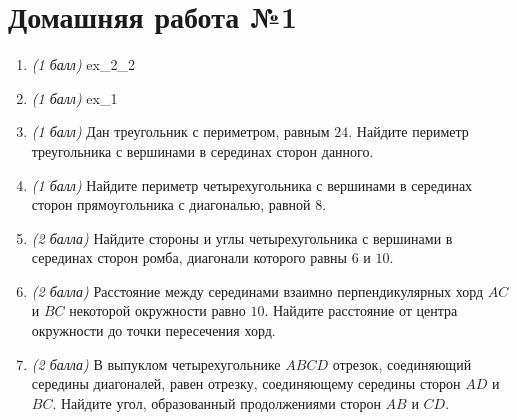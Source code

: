 \documentclass[12pt, a4paper]{article}
\begin{document}
	
	   \cfoot{}
	\section*{Домашняя работа №1}
	\begin{enumerate}
		\item \textit{(1 балл)} {ex_2_2}
		\item \textit{(1 балл)} {ex_1}
		\item \textit{(1 балл)} Дан треугольник с периметром, равным $24$. Найдите периметр треугольника с вершинами в серединах сторон данного.
		\item \textit{(1 балл)} Найдите периметр четырехугольника с вершинами в серединах сторон прямоугольника с диагональю, равной $8$.
		\item \textit{(2 балла)} Найдите стороны и углы четырехугольника с вершинами в серединах сторон ромба, диагонали которого равны $6$ и $10$.
		\item \textit{(2 балла)} Расстояние между серединами взаимно перпендикулярных хорд $AC$ и $BC$ некоторой окружности равно $10$. Найдите расстояние от центра окружности до точки пересечения хорд.
		\item \textit{(2 балла)} В выпуклом четырехугольнике $ABCD$ отрезок, соединяющий середины диагоналей, равен отрезку, соединяющему середины сторон $AD$ и $BC$. Найдите угол, образованный продолжениями сторон $AB$ и $CD$.
	\end{enumerate}
\end{document}
